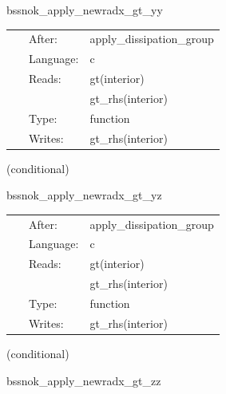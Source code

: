 \documentclass{article}
\begin{document}
\hspace{5mm} bssnok\_apply\_newradx\_gt\_yy 



\hspace{5mm}

 \begin{tabular*}{160mm}{cll} 
~ & After:  & apply\_dissipation\_group \\ 
~ & Language:  & c \\ 
~ & Reads:  & gt(interior) \\ 
~& ~ &gt\_rhs(interior)\\ 
~ & Type:  & function \\ 
~ & Writes:  & gt\_rhs(interior) \\ 
\end{tabular*} 


\vspace{5mm}

   (conditional) 

\hspace{5mm} bssnok\_apply\_newradx\_gt\_yz 



\hspace{5mm}

 \begin{tabular*}{160mm}{cll} 
~ & After:  & apply\_dissipation\_group \\ 
~ & Language:  & c \\ 
~ & Reads:  & gt(interior) \\ 
~& ~ &gt\_rhs(interior)\\ 
~ & Type:  & function \\ 
~ & Writes:  & gt\_rhs(interior) \\ 
\end{tabular*} 


\vspace{5mm}

   (conditional) 

\hspace{5mm} bssnok\_apply\_newradx\_gt\_zz 
\end{document}
